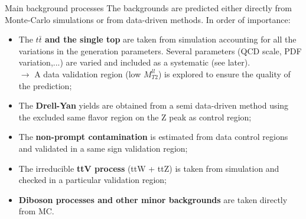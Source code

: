 \documentclass[8pt]{beamer}
\begin{document}
\begin{frame}{Main background processes}
\justifying
The backgrounds are predicted either directly from \alert{Monte-Carlo simulations or from data-driven methods}. In order of importance:

\begin{itemize}
\justifying
\item The \textbf{$t \bar t$ and the single top} are taken from simulation accounting for all the variations in the generation parameters. Several parameters (QCD scale, PDF variation,...) are varied and included as a systematic (see later). \\
$\rightarrow$ A data validation region (low $M_{T2}^{ll}$) is explored to ensure the quality of the prediction;
\item The \textbf{Drell-Yan} yields are obtained from a semi data-driven method using the excluded same flavor region on the Z peak as control region;
\item The \textbf{non-prompt contamination} is estimated from data control regions and validated in a same sign validation region;
\item The irreducible \textbf{ttV process} (ttW + ttZ) is taken from simulation and checked in a particular validation region;
\item \textbf{Diboson processes and other minor backgrounds} are taken directly from MC.
\end{itemize}
\end{frame}
\end{document}
